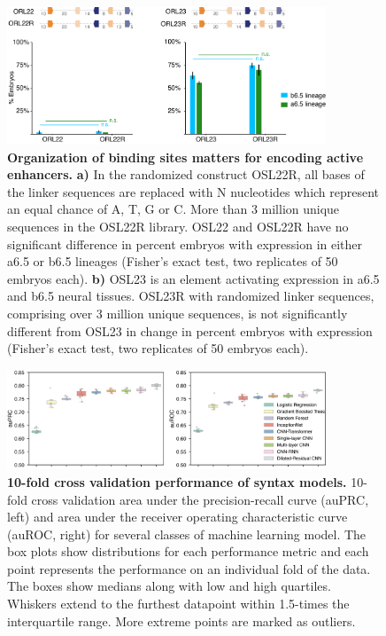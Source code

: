 \begin{figure}[p]
    \centering
    \includegraphics[width=0.85\textwidth]{2_figures-and-files/SuppFig5.png}
    \caption[Organization of binding sites matters for encoding active enhancers.]{\textbf{Organization of binding sites matters for encoding active enhancers.} \textbf{a)} In the randomized construct OSL22R, all bases of the linker sequences are replaced with N nucleotides which represent an equal chance of A, T, G or C. More than 3 million unique sequences in the OSL22R library. OSL22 and OSL22R have no significant difference in percent embryos with expression in either a6.5 or b6.5 lineages (Fisher’s exact test, two replicates of 50 embryos each). \textbf{b)} OSL23 is an element activating expression in a6.5 and b6.5 neural tissues. OSL23R with randomized linker sequences, comprising over 3 million unique sequences, is not significantly different from OSL23 in change in percent embryos with expression (Fisher’s exact test, two replicates of 50 embryos each).}
    \label{fig:supplementary_5}
\end{figure}

\begin{figure}[p]
    \centering
    \includegraphics[width=0.85\textwidth]{2_figures-and-files/SuppFig6.png}
    \caption[10-fold cross validation performance of syntax models.]{\textbf{10-fold cross validation performance of syntax models.} 10-fold cross validation area under the precision-recall curve (auPRC, left) and area under the receiver operating characteristic curve (auROC, right) for several classes of machine learning model. The box plots show distributions for each performance metric and each point represents the performance on an individual fold of the data. The boxes show medians along with low and high quartiles. Whiskers extend to the furthest datapoint within 1.5-times the interquartile range. More extreme points are marked as outliers.}
    \label{fig:supplementary_6}
\end{figure}

